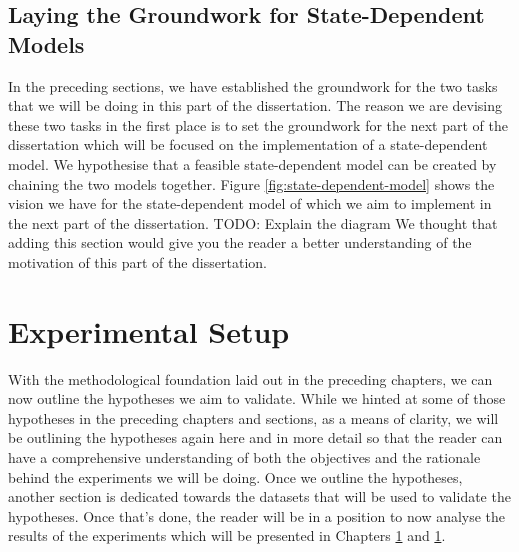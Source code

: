 \documentclass[logo,bsc,singlespacing,parskip,online]{infthesis}
\begin{document}
\section{Laying the Groundwork for State-Dependent Models}
In the preceding sections, we have established the groundwork for the two tasks that we will be doing in this part of the dissertation.
The reason we are devising these two tasks in the first place is to set the groundwork for the next part of the dissertation which 
will be focused on the implementation of a state-dependent model. We hypothesise that a feasible state-dependent model can be created 
by chaining the two models together. Figure \ref{fig:state-dependent-model} shows the vision we have for the state-dependent model 
of which we aim to implement in the next part of the dissertation.
TODO: Explain the diagram
We thought that adding this section would give you the reader a better understanding of the motivation of this part of the dissertation. 


\chapter{Experimental Setup}
\label{chap:experimental_setup}
With the methodological foundation laid out in the preceding chapters, we can now outline the hypotheses we aim to validate.
While we hinted at some of those hypotheses in the preceding chapters and sections, as a means of clarity, 
we will be outlining the hypotheses again here and in more detail so that the reader can have a comprehensive understanding of 
both the objectives and the rationale behind the experiments we will be doing.
Once we outline the hypotheses, another section is dedicated towards the datasets that will be used to validate the hypotheses.
Once that's done, the reader will be in a position to now analyse the results of the experiments which will be presented in Chapters \ref{} and \ref{}.
\end{document}
